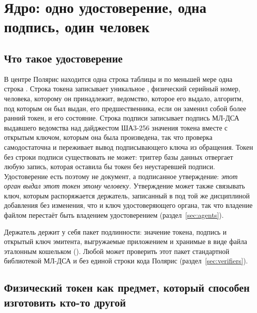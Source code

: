 \section{Ядро: одно удостоверение, одна подпись, один человек}
\label{sec:core}


\subsection{Что такое удостоверение}

В центре Полярис находится одна строка таблицы  и по меньшей мере одна
строка . Строка токена записывает уникальное ,
физический серийный номер, человека, которому он принадлежит, ведомство, которое его выдало,
алгоритм, под которым он был выдан, его предшественника, если он заменил собой более ранний
токен, и его состояние. Строка подписи записывает подпись МЛ-ДСА выдавшего ведомства над дайджестом
ША3-256 значения токена вместе с открытым ключом, которым она была произведена, так что проверка
самодостаточна и переживает вывод подписывающего ключа из обращения. Токен без строки подписи
существовать не может: триггер базы данных отвергает любую запись, которая оставила бы токен без
неустаревшей подписи. Удостоверение есть поэтому не документ, а подписанное утверждение:
\emph{этот орган выдал этот токен этому человеку.} Утверждение может также
связывать ключ, которым распоряжается держатель, записанный в  под той же
дисциплиной добавления без изменения, что и ключ удостоверяющего органа, так что владение файлом
перестаёт быть владением удостоверением (раздел~\ref{sec:agents}). \sImpl

Держатель держит у себя пакет подлинности: значение токена, подпись и открытый ключ эмитента,
выгружаемые приложением и хранимые в виде файла эталонным кошельком
(). Любой может проверить этот пакет стандартной библиотекой
МЛ-ДСА и без единой строки кода Полярис (раздел~\ref{sec:verifiers}).

\subsection{Физический токен как предмет, который способен изготовить кто-то другой}

